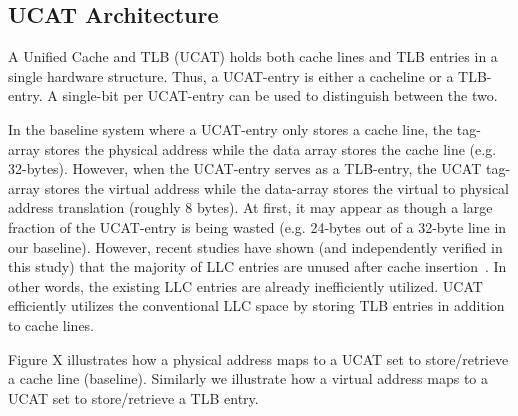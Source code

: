 
\subsection{UCAT Architecture}

\noindent A Unified Cache and TLB (UCAT) holds both cache lines and
TLB entries in a single hardware structure. Thus, a UCAT-entry is
either a cacheline or a TLB-entry. A single-bit per UCAT-entry can be
used to distinguish between the two.

In the baseline system where a UCAT-entry only stores a cache line,
the tag-array stores the physical address while the data array stores
the cache line (e.g. 32-bytes). However, when the UCAT-entry serves as
a TLB-entry, the UCAT tag-array stores the virtual address while the
data-array stores the virtual to physical address translation (roughly
8 bytes). At first, it may appear as though a large fraction of the
UCAT-entry is being wasted (e.g. 24-bytes out of a 32-byte line in our
baseline). However, recent studies have shown (and independently
verified in this study) that the majority of LLC entries are unused
after cache insertion~\cite{}. In other words, the existing LLC
entries are already inefficiently utilized. UCAT efficiently utilizes
the conventional LLC space by storing TLB entries in addition to cache
lines.

Figure X illustrates how a physical address maps to a UCAT set to
store/retrieve a cache line (baseline). Similarly we illustrate how a
virtual address maps to a UCAT set to store/retrieve a TLB entry.

